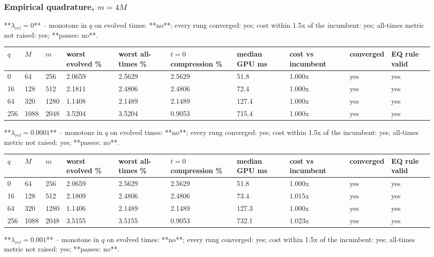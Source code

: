 \documentclass[11pt]{article}
\begin{document}
\subsubsection{Empirical quadrature, $m = 4M$}
**$\lambda_{rel} = 0$** -- monotone in $q$ on evolved times: **no**; every rung converged: yes; cost within 1.5x of the incumbent: yes; all-times metric not raised: yes; **passes: no**.

\begin{table}[htbp]\centering\small
\begin{tabular}{llllllllll}\hline
$q$ & $M$ & $m$ & worst evolved \% & worst all-times \% & $t=0$ compression \% & median GPU ms & cost vs incumbent & converged & EQ rule valid \\ \hline
0 & 64 & 256 & 2.0659 & 2.5629 & 2.5629 & 51.8 & 1.000x & yes & yes \\
16 & 128 & 512 & 2.1811 & 2.4806 & 2.4806 & 72.4 & 1.000x & yes & yes \\
64 & 320 & 1280 & 1.1408 & 2.1489 & 2.1489 & 127.4 & 1.000x & yes & yes \\
256 & 1088 & 2048 & 3.5204 & 3.5204 & 0.9053 & 715.4 & 1.000x & yes & yes \\
\hline\end{tabular}
\end{table}
**$\lambda_{rel} = 0.0001$** -- monotone in $q$ on evolved times: **no**; every rung converged: yes; cost within 1.5x of the incumbent: yes; all-times metric not raised: yes; **passes: no**.

\begin{table}[htbp]\centering\small
\begin{tabular}{llllllllll}\hline
$q$ & $M$ & $m$ & worst evolved \% & worst all-times \% & $t=0$ compression \% & median GPU ms & cost vs incumbent & converged & EQ rule valid \\ \hline
0 & 64 & 256 & 2.0659 & 2.5629 & 2.5629 & 51.8 & 1.000x & yes & yes \\
16 & 128 & 512 & 2.1809 & 2.4806 & 2.4806 & 73.4 & 1.015x & yes & yes \\
64 & 320 & 1280 & 1.1406 & 2.1489 & 2.1489 & 127.3 & 1.000x & yes & yes \\
256 & 1088 & 2048 & 3.5155 & 3.5155 & 0.9053 & 732.1 & 1.023x & yes & yes \\
\hline\end{tabular}
\end{table}
**$\lambda_{rel} = 0.001$** -- monotone in $q$ on evolved times: **no**; every rung converged: yes; cost within 1.5x of the incumbent: yes; all-times metric not raised: yes; **passes: no**.
\end{document}
